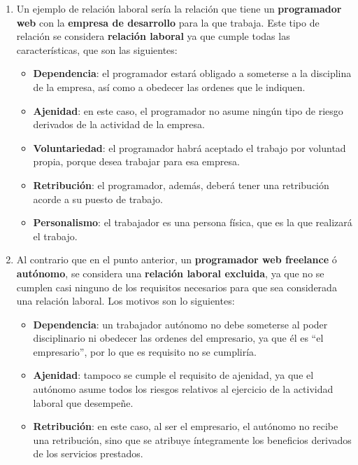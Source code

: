 \begin{enumerate}[label=(\alph*)]
    \item Un ejemplo de relación laboral sería la relación que tiene un \textbf{programador web} con la \textbf{empresa de desarrollo} para la que trabaja. Este tipo de relación se considera \textbf{relación laboral} ya que cumple todas las características, que son las siguientes:

    \begin{itemize}
        \item \textbf{Dependencia}: el programador estará obligado a someterse a la disciplina de la empresa, así como a obedecer las ordenes que le indiquen.
        \item \textbf{Ajenidad}: en este caso, el programador no asume ningún tipo de riesgo derivados de la actividad de la empresa.
        \item \textbf{Voluntariedad}: el programador habrá aceptado el trabajo por voluntad propia, porque desea trabajar para esa empresa.
        \item \textbf{Retribución}: el programador, además, deberá tener una retribución acorde a su puesto de trabajo.
        \item \textbf{Personalismo}: el trabajador es una persona física, que es la que realizará el trabajo.
    \end{itemize}


    \item Al contrario que en el punto anterior, un  \textbf{programador web freelance} ó \textbf{autónomo}, se considera una \textbf{relación laboral excluida}, ya que no se cumplen casi ninguno de los requisitos necesarios para que sea considerada una relación laboral. Los motivos son lo siguientes:

    \begin{itemize}
        \item \textbf{Dependencia}: un trabajador autónomo no debe someterse al poder disciplinario ni obedecer las ordenes del empresario, ya que él es ``el empresario'', por lo que es requisito no se cumpliría.
        \item \textbf{Ajenidad}: tampoco se cumple el requisito de ajenidad, ya que el autónomo asume todos los riesgos relativos al ejercicio de la actividad laboral que desempeñe.
        \item \textbf{Retribución}: en este caso, al ser el empresario, el autónomo no recibe una retribución, sino que se atribuye íntegramente los beneficios derivados de los servicios prestados.
    \end{itemize}


\end{enumerate}
